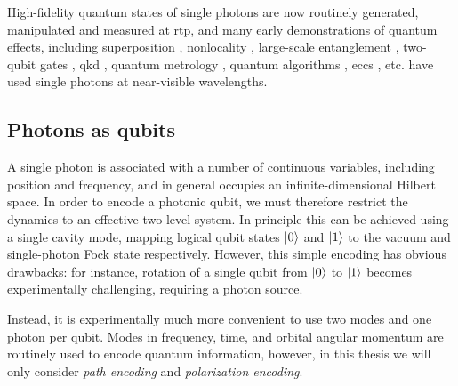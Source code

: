 High-fidelity quantum states of single photons are now routinely generated, manipulated and measured at \gls{rtp}, and many early demonstrations of quantum effects, including superposition \cite{Taylor1909}, nonlocality \cite{Aspect1982c}, large-scale entanglement \cite{Yao2012}, two-qubit gates \cite{OBrien2003}, \gls{qkd} \cite{Dixon2008}, quantum metrology \cite{Rarity1990f}, quantum algorithms \cite{Lu2007c, Lanyon2007, Politi2009a}, \glspl{ecc} \cite{Barz2013}, etc. have used single photons at near-visible wavelengths.


\subsection{Photons as qubits}
\label{sec:photons-as-qubits}
A single photon is associated with a number of continuous variables, including position and frequency, and in general occupies an infinite-dimensional Hilbert space. In order to encode a photonic qubit, we must therefore restrict the dynamics to an effective two-level system. In principle this can be achieved using a single cavity mode, mapping logical qubit states $\mbox{$ | 0 \rangle $}$ and $\mbox{$ | 1 \rangle $}$ to the vacuum and single-photon Fock state respectively. However, this simple encoding has obvious drawbacks: for instance, rotation of a single qubit from $\mbox{$ | 0 \rangle $}$ to $\mbox{$ | 1 \rangle $}$ becomes experimentally challenging, requiring a photon source.

Instead, it is experimentally much more convenient to use two modes and one photon per qubit. Modes in frequency, time, and orbital angular momentum \cite{Cai2012} are routinely used to encode quantum information, however, in this thesis we will only consider \emph{path encoding} and \emph{polarization encoding}.


